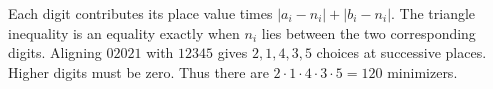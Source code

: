 Each digit contributes its place value times $|a_i-n_i|+|b_i-n_i|$. The triangle inequality is an equality exactly when $n_i$ lies between the two corresponding digits. Aligning $02021$ with $12345$ gives $2,1,4,3,5$ choices at successive places. Higher digits must be zero. Thus there are $2\cdot1\cdot4\cdot3\cdot5=\boxed{120}$ minimizers.
